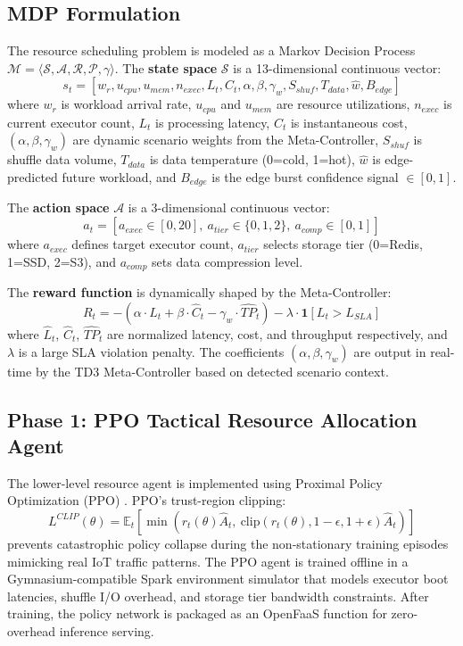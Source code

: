 \documentclass[10pt, conference, compsocconf]{IEEEtran}
\begin{document}
\subsection{MDP Formulation}

The resource scheduling problem is modeled as a Markov Decision Process $\mathcal{M} = \langle \mathcal{S}, \mathcal{A}, \mathcal{R}, \mathcal{P}, \gamma \rangle$. The \textbf{state space} $\mathcal{S}$ is a 13-dimensional continuous vector:
\[
s_t = [w_r, u_{cpu}, u_{mem}, n_{exec}, L_t, C_t, \alpha, \beta, \gamma_{w}, S_{shuf}, T_{data}, \hat{w}, B_{edge}]
\]
where $w_r$ is workload arrival rate, $u_{cpu}$ and $u_{mem}$ are resource utilizations, $n_{exec}$ is current executor count, $L_t$ is processing latency, $C_t$ is instantaneous cost, $(\alpha, \beta, \gamma_w)$ are dynamic scenario weights from the Meta-Controller, $S_{shuf}$ is shuffle data volume, $T_{data}$ is data temperature (0=cold, 1=hot), $\hat{w}$ is edge-predicted future workload, and $B_{edge}$ is the edge burst confidence signal $\in [0, 1]$.

The \textbf{action space} $\mathcal{A}$ is a 3-dimensional continuous vector:
\[
a_t = [a_{exec} \in [0, 20],\ a_{tier} \in \{0,1,2\},\ a_{comp} \in [0,1]]
\]
where $a_{exec}$ defines target executor count, $a_{tier}$ selects storage tier (0=Redis, 1=SSD, 2=S3), and $a_{comp}$ sets data compression level.

The \textbf{reward function} is dynamically shaped by the Meta-Controller:
\[
R_t = -\left(\alpha \cdot \hat{L}_t + \beta \cdot \hat{C}_t - \gamma_w \cdot \hat{TP}_t\right) - \lambda \cdot \mathbf{1}[L_t > L_{SLA}]
\]
where $\hat{L}_t$, $\hat{C}_t$, $\hat{TP}_t$ are normalized latency, cost, and throughput respectively, and $\lambda$ is a large SLA violation penalty. The coefficients $(\alpha, \beta, \gamma_w)$ are output in real-time by the TD3 Meta-Controller based on detected scenario context.

\subsection{Phase 1: PPO Tactical Resource Allocation Agent}

The lower-level resource agent is implemented using Proximal Policy Optimization (PPO) \cite{schulman2017ppo}. PPO's trust-region clipping:
\[
L^{CLIP}(\theta) = \mathbb{E}_t\left[\min\left(r_t(\theta)\hat{A}_t,\ \text{clip}(r_t(\theta), 1-\epsilon, 1+\epsilon)\hat{A}_t\right)\right]
\]
prevents catastrophic policy collapse during the non-stationary training episodes mimicking real IoT traffic patterns. The PPO agent is trained offline in a Gymnasium-compatible Spark environment simulator that models executor boot latencies, shuffle I/O overhead, and storage tier bandwidth constraints. After training, the policy network is packaged as an OpenFaaS function for zero-overhead inference serving.
\end{document}
